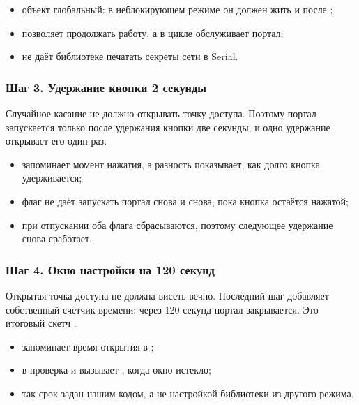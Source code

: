 
\begin{itemize}[leftmargin=*]
  \item объект  глобальный: в неблокирующем режиме он должен жить и после ;
  \item {} позволяет  продолжать работу, а
         в цикле обслуживает портал;
  \item {} не даёт библиотеке печатать секреты сети в Serial.
\end{itemize}

\subsubsection{Шаг 3. Удержание кнопки 2 секунды}

Случайное касание не должно открывать точку доступа. Поэтому портал запускается только после удержания
кнопки две секунды, и одно удержание открывает его один раз.


\begin{itemize}[leftmargin=*]
  \item {} запоминает момент нажатия, а разность  показывает, как долго
        кнопка удерживается;
  \item флаг  не даёт запускать портал снова и снова, пока кнопка остаётся нажатой;
  \item при отпускании оба флага сбрасываются, поэтому следующее удержание снова сработает.
\end{itemize}

\subsubsection{Шаг 4. Окно настройки на 120 секунд}

Открытая точка доступа не должна висеть вечно. Последний шаг добавляет собственный счётчик
времени: через 120 секунд портал закрывается. Это итоговый скетч .


\begin{itemize}[leftmargin=*]
  \item {} запоминает время открытия в ;
  \item в  проверка  и  вызывает
        , когда окно истекло;
  \item так срок задан нашим кодом, а не настройкой библиотеки из другого режима.
\end{itemize}

